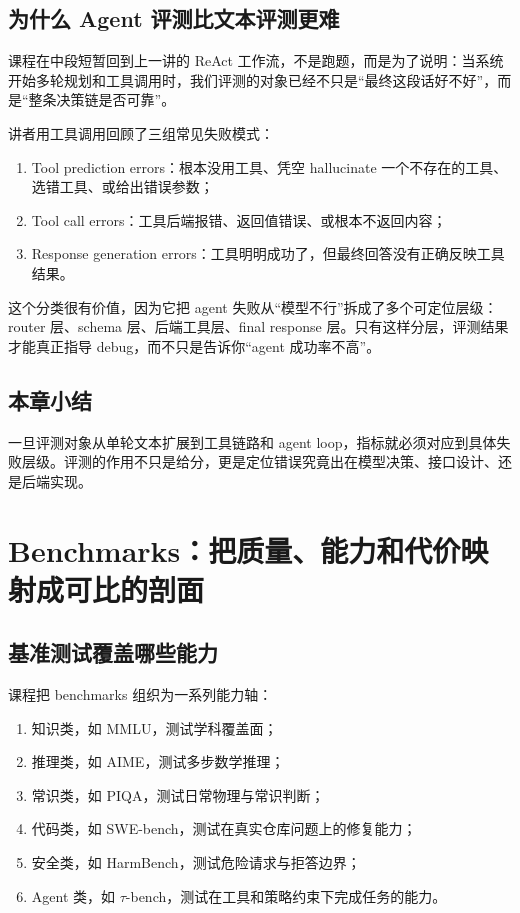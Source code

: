 \documentclass[a4paper]{article}
\begin{document}
\subsection{为什么 Agent 评测比文本评测更难}

课程在中段短暂回到上一讲的 ReAct 工作流，不是跑题，而是为了说明：当系统开始多轮规划和工具调用时，我们评测的对象已经不只是“最终这段话好不好”，而是“整条决策链是否可靠”。

讲者用工具调用回顾了三组常见失败模式：

\begin{enumerate}
\item Tool prediction errors：根本没用工具、凭空 hallucinate 一个不存在的工具、选错工具、或给出错误参数；
\item Tool call errors：工具后端报错、返回值错误、或根本不返回内容；
\item Response generation errors：工具明明成功了，但最终回答没有正确反映工具结果。
\end{enumerate}

这个分类很有价值，因为它把 agent 失败从“模型不行”拆成了多个可定位层级：router 层、schema 层、后端工具层、final response 层。只有这样分层，评测结果才能真正指导 debug，而不只是告诉你“agent 成功率不高”。

\subsection{本章小结}

一旦评测对象从单轮文本扩展到工具链路和 agent loop，指标就必须对应到具体失败层级。评测的作用不只是给分，更是定位错误究竟出在模型决策、接口设计、还是后端实现。

\section{Benchmarks：把质量、能力和代价映射成可比的剖面}

\subsection{基准测试覆盖哪些能力}

课程把 benchmarks 组织为一系列能力轴：

\begin{enumerate}
\item 知识类，如 MMLU，测试学科覆盖面；
\item 推理类，如 AIME，测试多步数学推理；
\item 常识类，如 PIQA，测试日常物理与常识判断；
\item 代码类，如 SWE-bench，测试在真实仓库问题上的修复能力；
\item 安全类，如 HarmBench，测试危险请求与拒答边界；
\item Agent 类，如 $\tau$-bench，测试在工具和策略约束下完成任务的能力。
\end{enumerate}
\end{document}
